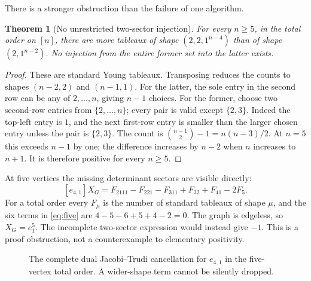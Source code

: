 \documentclass[11pt,a4paper]{article}
\newtheorem{theorem}{Theorem}[section]
\theoremstyle{definition}
\begin{document}
There is a stronger obstruction than the failure of one algorithm.

\begin{theorem}[No unrestricted two-sector injection]\label{thm:count}
For every $n\ge5$, in the total order on $[n]$, there are more tableaux of
shape $(2,2,1^{n-4})$ than of shape $(2,1^{n-2})$. No injection from the
entire former set into the latter exists.
\end{theorem}
\begin{proof}
These are standard Young tableaux. Transposing reduces the counts to shapes
$(n-2,2)$ and $(n-1,1)$. For the latter, the sole entry in the second row can
be any of $2,\ldots,n$, giving $n-1$ choices. For the former, choose two
second-row entries from $\{2,\ldots,n\}$; every pair is valid except
$\{2,3\}$. Indeed the top-left entry is $1$, and the next first-row entry
is smaller than the larger chosen entry unless the pair is $\{2,3\}$.
The count is $\binom{n-1}{2}-1=n(n-3)/2$.
At $n=5$ this exceeds $n-1$ by one; the difference increases by $n-2$
when $n$ increases to $n+1$. It is therefore positive for every $n\ge5$.
\end{proof}

At five vertices the missing determinant sectors are visible directly:
\begin{equation}\label{eq:five}
 [e_{4,1}]X_G=F_{2111}-F_{221}-F_{311}+F_{32}+F_{41}-2F_5.
\end{equation}
For a total order every $F_\mu$ is the number of standard tableaux of shape
$\mu$, and the six terms in \eqref{eq:five} are $4-5-6+5+4-2=0$.
The graph is edgeless, so $X_G=e_1^5$. The incomplete two-sector expression
would instead give $-1$. This is a proof obstruction, not a counterexample to
elementary positivity.

\begin{figure}[ht]
\centering
{}
\caption{The complete dual Jacobi--Trudi cancellation for $e_{4,1}$ in the
five-vertex total order. A wider-shape term cannot be silently dropped.}
\end{figure}
\end{document}
